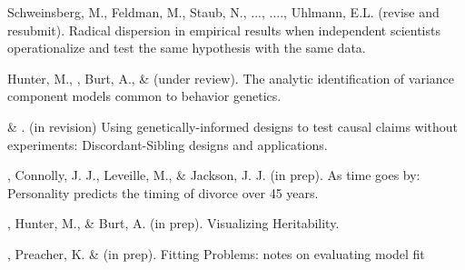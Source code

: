 \item Schweinsberg, M., Feldman, M., Staub, N., ..., \meb ...., Uhlmann, E.L. (revise and resubmit). Radical dispersion in empirical results when independent scientists operationalize and test the same hypothesis with the same data. 

\item Hunter, M., \meb, Burt, A., \& \joe (under review). The analytic identification of variance component models common to behavior genetics.


\item \meb \& \joe. (in revision) Using genetically-informed designs to test causal claims without experiments: Discordant-Sibling designs and applications. \href{https://osf.io/zpdwt/}{\small\color{blue}{osf.io/zpdwt/}}%

\item \meb, Connolly, J. J., Leveille, M., \& Jackson, J. J. (in prep). As time goes by: Personality predicts the timing of divorce over 45 years.%

\item \meb, Hunter, M., \& Burt, A. (in prep). Visualizing Heritability.

\item \meb, Preacher, K. \& \joe(in prep). Fitting Problems: notes on evaluating model fit





